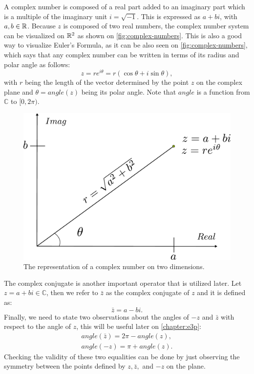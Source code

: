 A complex number is composed of a real part added to an imaginary part which is a multiple of the imaginary unit $i = \sqrt{-1}$. This is expressed as $a + bi$, with $a, b \in \mathbb{R}$. Because $z$ is composed of two real numbers, the complex number system can be visualized on $\mathbb{R}^2$ as shown on \autoref{fig:complex-numbers}. This is also a good way to visualize Euler's Formula, as it can be also seen on \autoref{fig:complex-numbers}, which says that any complex number can be written in terms of its radius and polar angle as follows:
\begin{equation*}
z = re^{i\theta}=r(\cos{\theta} + i\sin{\theta}),
\end{equation*}
with $r$ being the length of the vector determined by the point $z$ on the complex plane and $\theta = angle(z)$ being its polar angle. Note that $angle$ is a function from $\mathbb{C}$ to $[0, 2\pi)$.
\begin{figure}[ht]
	\centering
	\def\svgwidth{\columnwidth}
	\includegraphics[scale=.37]{tex/figures/complex_numbers}
	\caption{The representation of a complex number on two dimensions.}
	\label{fig:complex-numbers}
\end{figure}

The complex conjugate is another important operator that is utilized later. Let $z = a + bi \in \mathbb{C}$, then we refer to $\bar{z}$ as the complex conjugate of $z$ and it is defined as:
\begin{equation*}
\bar{z} = a - bi.
\end{equation*}
Finally, we need to state two observations about the angles of $-z$ and $\bar{z}$ with respect to the angle of $z$, this will be useful later on \autoref{chapter:e3p}:
\begin{align*}
angle(\bar{z}) = 2\pi-angle(z),\\
angle(-z) = \pi + angle(z).
\end{align*}
Checking the validity of these two equalities can be done by just observing the symmetry between the points defined by $z, \bar{z},$ and $-z$ on the plane.


